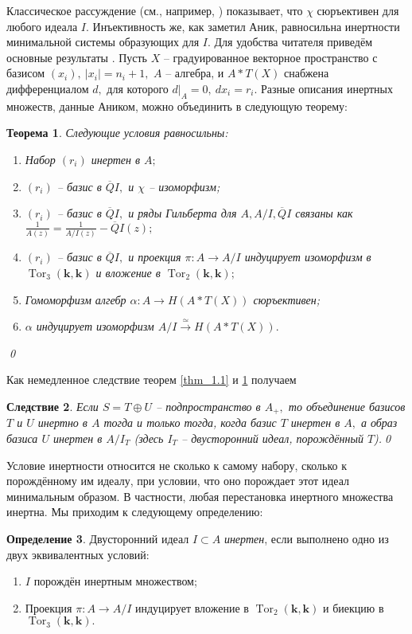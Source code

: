 \documentclass[10pt,a4paper]{article}
\DeclareMathOperator{\Tor}{Tor}
\def\k{\mathbf{k}}
\newtheorem{thm}{Теорема}[section]
\newtheorem{crl}[thm]{Следствие}
\theoremstyle{definition}
\newtheorem{dfn}[thm]{Определение}
\begin{document}
Классическое рассуждение (см., например, \cite[(2.2)]{2}) показывает, что $\chi$ сюръективен для любого идеала $I.$ Инъективность же, как заметил Аник, равносильна инертности минимальной системы образующих для $I.$ Для удобства читателя приведём основные результаты \cite[\S 2]{2}.  Пусть $X$ -- градуированное векторное пространство с базисом $(x_i),~|x_i|=n_i+1,$ $A$ -- алгебра, и $A\ast T(X)$ снабжена дифференциалом $d,$ для которого $d|_{A}=0,~dx_i=r_i.$ Разные описания инертных множеств, данные Аником, можно объединить в следующую теорему:
\begin{thm}\label{thm_2.4}
Следующие условия равносильны:
\begin{enumerate}
\item[(i)] Набор $(r_i)$ инертен в $A;$
\item[(ii)] $(r_i)$ -- базис в $\overline{Q}I,$ и $\chi$ -- изоморфизм;
\item[(iii)] $(r_i)$ -- базис в $\overline{Q}I,$ и ряды Гильберта для $A,A/I,\overline{Q}I$ связаны как $\frac{1}{A(z)}=\frac{1}{A/I(z)}-\overline{Q}I(z);$
\item[(iv)]$(r_i)$ -- базис в $\overline{Q}I,$ и проекция $\pi:A\to A/I$ индуцирует изоморфизм в $\Tor_3(\k,\k)$ и вложение в $\Tor_2(\k,\k);$
\item[(v)] Гомоморфизм алгебр $\alpha:A\to H(A\ast T(X))$ сюръективен;
\item[(vi)] $\alpha$ индуцирует изоморфизм $A/I\overset{\simeq}{\longrightarrow} H(A\ast T(X)).$
\end{enumerate}\qed
\end{thm}
Как немедленное следствие теорем \ref{thm_1.1} и \ref{thm_2.4} получаем
\begin{crl}\label{crl_2.5}
Если $S=T\oplus U$ -- подпространство в $A_+,$ то объединение базисов $T$ и $U$ инертно в $A$ тогда и только тогда, когда базис $T$ инертен в $A,$ а образ базиса $U$ инертен в $A/I_T$ (здесь $I_T$ -- двусторонний идеал, порождённый $T$).\qed
\end{crl}
Условие инертности относится не сколько к самому набору, сколько к порождённому им идеалу, при условии, что оно порождает этот идеал минимальным образом. В частности, любая перестановка инертного множества инертна. Мы приходим к следующему определению:
\begin{dfn}\label{dfn_2.6}
Двусторонний идеал $I\subset A$ \emph{инертен}, если выполнено одно из двух эквивалентных условий:
\begin{enumerate}
\item[(i)] $I$ порождён инертным множеством;
\item[(ii)] Проекция $\pi:A\to A/I$ индуцирует вложение в $\Tor_2(\k,\k)$ и биекцию в $\Tor_3(\k,\k).$
\end{enumerate}
\end{dfn}
\end{document}
